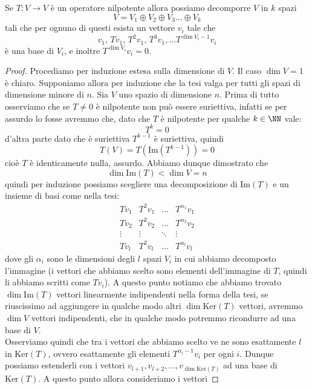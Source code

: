 \documentclass[11pt]{scrartcl}
\newcommand{\Immagine}[1]{\text{Im}\left(#1\right)}
\renewcommand{\ker}[1]{\text{Ker}\left(#1\right)}
\begin{document}
   	 \begin{theorem}
   	 	Se $T:V\to V$ è un operatore nilpotente allora possiamo decomporre $V$ in $k$ spazi
   	 	$$V=V_1\oplus V_2\oplus V_3\dots \oplus V_k$$
   	 	tali che per ognuno di questi esista un vettore $v_i$ tale che
   	 	$$v_1,\, Tv_1,\, T^2v_1,\, T^3v_1,\dots T^{\dim V_i-1}v_i$$
   	 	è una base di $V_i$, e inoltre $T^{\dim V_i}v_i=0$.
   	 \end{theorem}
   	 \begin{proof}
   	 	Procediamo per induzione estesa sulla dimensione di $V$. Il caso $\dim V=1$ è chiaro. Supponiamo allora per induzione che la tesi valga per tutti gli spazi di dimensione minore di $n$. Sia $V$ uno spazio di dimensione $n$. Prima di tutto osserviamo che se $T\ne 0$ è nilpotente non può essere suriettiva, infatti se per assurdo lo fosse avremmo che, dato che $T$ è nilpotente per qualche $k\in \NN$ vale:
   	 	$$T^k=0$$
   	 	d'altra parte dato che è suriettiva $T^{k-1}$ è suriettiva, quindi $$T(V)=T\left(\Immagine{T^{k-1}}\right)=0$$
   	 	cioè $T$ è identicamente nulla, assurdo. Abbiamo dunque dimostrato che 
   	 	$$\dim\Immagine{T}< \dim V=n$$
   	 	quindi per induzione possiamo scegliere una decomposizione di $\Immagine{T}$ e un insieme di basi come nella tesi:
   	 	$$
   	 	\begin{array}{cccc}
   	 		Tv_1 & T^2v_1 & \dots & T^{\alpha_1}v_1 \\
   	 		Tv_2 & T^2v_2 & \dots & T^{\alpha_2}v_2 \\
   	 		\vdots & \vdots & \ddots & \vdots \\
   	 		Tv_l & T^2v_l & \dots & T^{\alpha_l}v_l
   	 	\end{array}
   	 	$$
   	 	dove gli $\alpha_i$ sono le dimensioni degli $l$ spazi $V_i$ in cui abbiamo decomposto l'immagine (i vettori che abbiamo scelto sono elementi dell'immagine di $T$, quindi li abbiamo scritti come $Tv_i$). A questo punto notiamo che abbiamo trovato $\dim\Immagine{T}$ vettori linearmente indipendenti nella forma della tesi, se riuscissimo ad aggiungere in qualche modo altri $\dim\ker{T}$ vettori, avremmo $\dim V$ vettori indipendenti, che in qualche modo potremmo ricondurre ad una base di $V$. \\
   	 	Osserviamo quindi che tra i vettori che abbiamo scelto ve ne sono esattamente $l$ in $\ker{T}$, ovvero esattamente gli elementi $T^{\alpha_i-1}v_i$ per ogni $i$. Dunque possiamo estenderli con i vettori $v_{l+1},v_{l+2},\dots,v_{\dim\ker{T}}$ ad una base di $\ker{T}$. A questo punto allora consideriamo i vettori

\end{proof}
\end{document}
